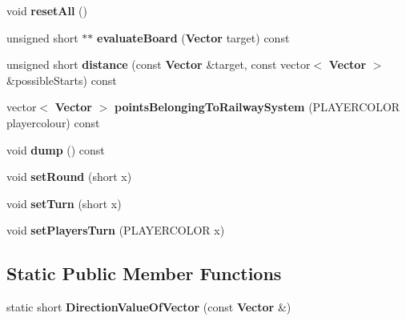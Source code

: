 \begin{DoxyCompactItemize}
\item 
void {\bfseries reset\-All} ()\label{class_state_ae3cf3d6f8fd90d8a59d53ccb1290a46c}

\item 
unsigned short $\ast$$\ast$ {\bfseries evaluate\-Board} ({\bf Vector} target) const \label{class_state_a5bc0dd359e67c72d457a64277afaf621}

\item 
unsigned short {\bfseries distance} (const {\bf Vector} \&target, const vector$<$ {\bf Vector} $>$ \&possible\-Starts) const \label{class_state_adbb160a96efbc5fde9c7346bafe26988}

\item 
vector$<$ {\bf Vector} $>$ {\bfseries points\-Belonging\-To\-Railway\-System} (P\-L\-A\-Y\-E\-R\-C\-O\-L\-O\-R playercolour) const \label{class_state_a8797cce1b552bfb36f01cc8fba0f7e48}

\item 
void {\bfseries dump} () const \label{class_state_a27499f3070aef89461dbec0c99a24225}

\item 
void {\bfseries set\-Round} (short x)\label{class_state_a468eb35199b879f9df58245540ca849c}

\item 
void {\bfseries set\-Turn} (short x)\label{class_state_a5f8cd95cb039eb5333a9fed80b7efd2f}

\item 
void {\bfseries set\-Players\-Turn} (P\-L\-A\-Y\-E\-R\-C\-O\-L\-O\-R x)\label{class_state_a100c1959a9c60fdcd3400a3fda247588}

\end{DoxyCompactItemize}
\subsection*{Static Public Member Functions}
\begin{DoxyCompactItemize}
\item 
static short {\bfseries Direction\-Value\-Of\-Vector} (const {\bf Vector} \&)\label{class_state_a71c49cae9e5978384540e340bda83ef1}

\end{DoxyCompactItemize}
